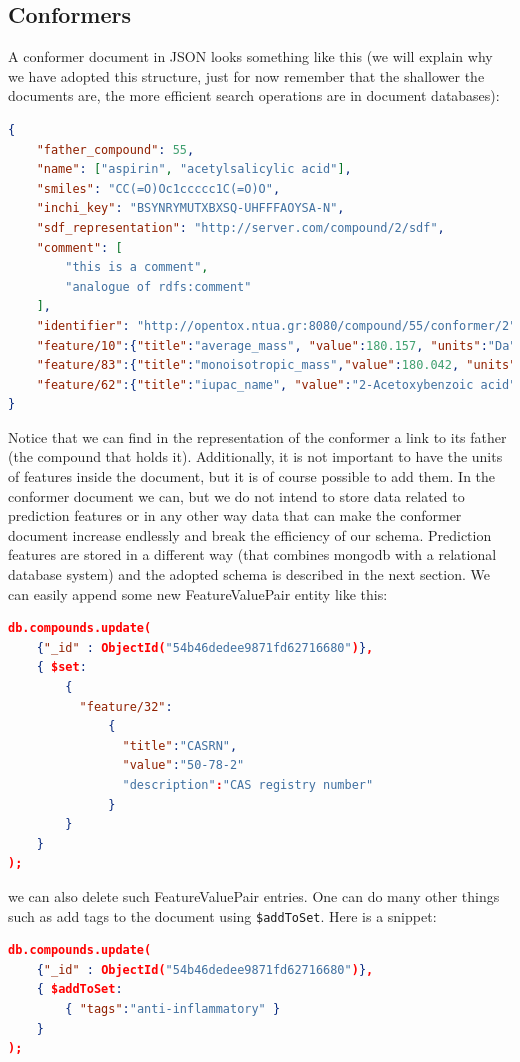 \subsection{Conformers}
A conformer document in JSON looks something like this 
(we will explain why we have adopted this structure, just for 
now remember that the shallower the documents are, the more 
efficient search operations are in document databases):
\begin{lstlisting}[language=json]
{ 
    "father_compound": 55, 
    "name": ["aspirin", "acetylsalicylic acid"], 
    "smiles": "CC(=O)Oc1ccccc1C(=O)O", 
    "inchi_key": "BSYNRYMUTXBXSQ-UHFFFAOYSA-N", 
    "sdf_representation": "http://server.com/compound/2/sdf", 
    "comment": [ 
        "this is a comment", 
        "analogue of rdfs:comment" 
    ], 
    "identifier": "http://opentox.ntua.gr:8080/compound/55/conformer/2", 
    "feature/10":{"title":"average_mass", "value":180.157, "units":"Da"}, 
    "feature/83":{"title":"monoisotropic_mass","value":180.042, "units":"Da"}, 
    "feature/62":{"title":"iupac_name", "value":"2-Acetoxybenzoic acid"} 
} 
\end{lstlisting}
Notice that we can find in the representation of the conformer a 
link to its father (the compound that holds it). Additionally, it is 
not important to have the units of features inside the document, but 
it is of course possible to add them. In the conformer document we can, 
but we do not intend to store data related to prediction features or 
in any other way data that can make the conformer document increase 
endlessly and break the efficiency of our schema. Prediction features 
are stored in a different way (that combines mongodb with a relational 
database system) and the adopted schema is described in the next section.
%
We can easily append some new FeatureValuePair entity like this:

\begin{lstlisting}[language=json] 
db.compounds.update(
    {"_id" : ObjectId("54b46dedee9871fd62716680")}, 
    { $set: 
        { 
          "feature/32": 
              { 
                "title":"CASRN", 
                "value":"50-78-2"
                "description":"CAS registry number"
              } 
        } 
    }
);
\end{lstlisting}

we can also delete such FeatureValuePair entries. One can do many other things such as add tags to the document using 
\texttt{\$addToSet}. Here is a snippet:

\begin{lstlisting}[language=json]
db.compounds.update(  
    {"_id" : ObjectId("54b46dedee9871fd62716680")},  
    { $addToSet:  
        { "tags":"anti-inflammatory" }  
    }  
); 
\end{lstlisting}

